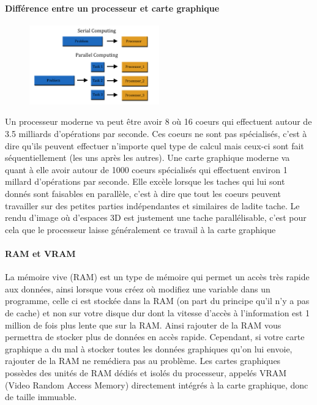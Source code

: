 \documentclass[a4paper,10pt]{article}
\begin{document}
\paragraph{Différence entre un processeur et carte graphique}
\begin{figure}
    \centering
    \includegraphics[width=0.5\textwidth]{parallel_computing_vs_sequential_computing}
\end{figure}
Un processeur moderne va peut être avoir 8 où 16 coeurs qui effectuent autour de 3.5 milliards d'opérations par seconde. Ces coeurs ne sont pas spécialisés, c'est à dire qu'ils peuvent effectuer n'importe quel type de calcul mais ceux-ci sont fait séquentiellement (les uns après les autres).
Une carte graphique moderne va quant à elle avoir autour de 1000 coeurs spécialisés qui effectuent environ 1 millard d'opérations par seconde. Elle excèle lorsque les taches qui lui sont donnés sont faisables en parallèle, c'est à dire que tout les coeurs peuvent travailler sur des petites parties indépendantes et similaires de ladite tache. Le rendu d'image où d'espaces 3D est justement une tache parallélisable, c'est pour cela que le processeur laisse généralement ce travail à la carte graphique

\paragraph{RAM et VRAM}
La mémoire vive (RAM) est un type de mémoire qui permet un accès très rapide aux données, ainsi lorsque vous créez où modifiez une variable dans un programme, celle ci est stockée dans la RAM (on part du principe qu'il n'y a pas de cache) et non sur votre disque dur dont la vitesse d'accès à l'information est 1 million de fois plus lente que sur la RAM. Ainsi rajouter de la RAM vous permettra de stocker plus de données en accès rapide. Cependant, si votre carte graphique a du mal à stocker toutes les données graphiques qu'on lui envoie, rajouter de la RAM ne remédiera pas au problème. Les cartes graphiques possèdes des unités de RAM dédiés et isolés du processeur, appelés VRAM (Video Random Access Memory) directement intégrés à la carte graphique, donc de taille immuable.
\end{document}
